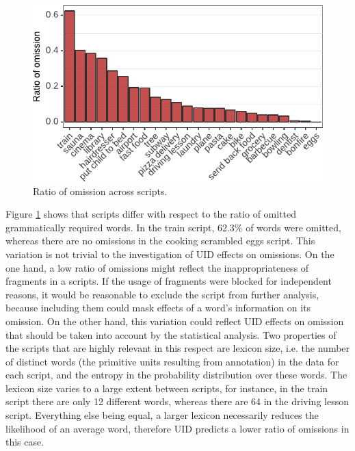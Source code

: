 \begin{figure}[t]
 \includegraphics{figures/scr_production_omission_ratio}
 \caption{Ratio of omission across scripts.\label{fig:scripts-ellratio}}
\end{figure}
%
Figure \ref{fig:scripts-ellratio} shows that scripts differ with respect to the ratio of omitted grammatically required words. In the train script, 62.3\% of words were omitted, whereas there are no omissions in the cooking scrambled eggs script. This variation is not trivial to the investigation of UID effects on omissions. On the one hand, a low ratio of omissions might reflect the inappropriateness of fragments in a scripts. If the usage of fragments were blocked for independent reasons, it would be reasonable to exclude the script from further analysis, because including them could mask effects of a word's information on its omission. On the other hand, this variation could reflect UID effects on omission that should be taken into account by the statistical analysis. Two properties of the scripts that are highly relevant in this respect are lexicon size, i.e. the number of distinct words (the primitive units resulting from annotation) in the data for each script, and the entropy in the probability distribution over these words. The lexicon size varies to a large extent between scripts, for instance, in the train script there are only 12 different words, whereas there are 64 in the driving lesson script. Everything else being equal, a larger lexicon necessarily reduces the likelihood of an average word, therefore UID predicts a lower ratio of omissions in this case.

